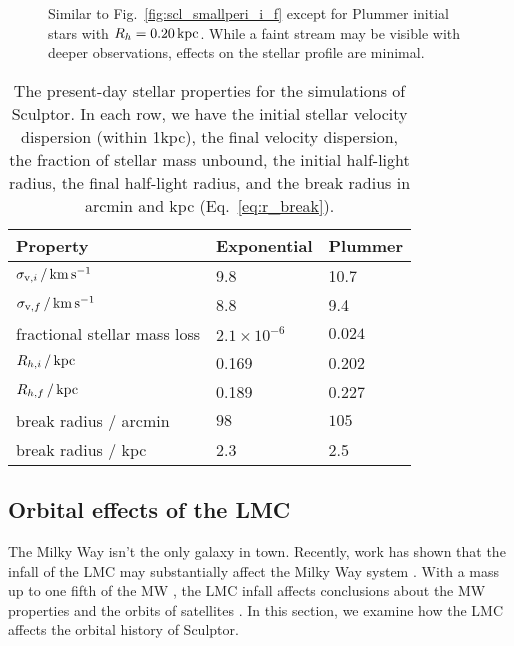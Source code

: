 \begin{figure}
\centering
{}
\caption[Sculptor Plummer initial and final density profiles]{Similar to
Fig.~\ref{fig:scl_smallperi_i_f} except for Plummer initial stars with
\(R_h = 0.20\,{\rm kpc}\). While a faint stream may be visible with deeper
observations, effects on the stellar profile are
minimal.}\label{fig:scl_smallperi_plummer_i_f}
\end{figure}

\begin{table*}[t]
\centering
\caption[Simulation results for Sculptor’s stars]{The present-day stellar properties for the simulations of Sculptor. In each row, we have the initial stellar velocity dispersion (within 1kpc), the final velocity dispersion, the fraction of stellar mass unbound, the initial half-light radius, the final half-light radius, and the break radius in arcmin and kpc (Eq. \ref{eq:r_break}). }
\label{tbl:scl_sim_stars_results}
\begin{tabular}{lll}
\toprule
Property & Exponential & Plummer\\
\midrule
$\sigma_{{\rm v}, i}\,/\,{\rm km\,s^{-1}}$ & 9.8 & 10.7\\
$\sigma_{{\rm v}, f} \,/\,{\rm km\,s^{-1}}$ & 8.8 & 9.4\\
fractional stellar mass loss & $2.1\times 10^{-6}$ & $0.024$\\
$R_{h, i}\,/\,{\rm kpc}$ & 0.169 & 0.202\\
$R_{h, f}\,/\,{\rm kpc}$ & 0.189 & 0.227\\
break radius / arcmin & $98$ & $105$\\
break radius / kpc & 2.3 & 2.5\\
\bottomrule
\end{tabular}
\end{table*}

\subsection{Orbital effects of the LMC}\label{sec:scl_lmc}

The Milky Way isn't the only galaxy in town. Recently, work has shown
that the infall of the LMC may substantially affect the Milky Way system
\citep[e.g.,][]{erkal+2019, cautun+2019, garavito-camargo+2021, vasiliev2023}.
With a mass up to one fifth of the MW \citep[e.g.,][]{penarrubia+2015},
the LMC infall affects conclusions about the MW properties and the
orbits of satellites \citep[see
e.g.,][]{patel+2020, battaglia+2022, correamagnus+vasiliev2022}. In this
section, we examine how the LMC affects the orbital history of Sculptor.

